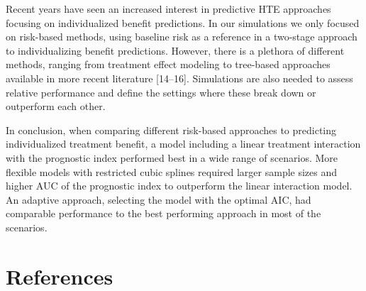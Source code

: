 \documentclass{article}
\begin{document}
Recent years have seen an increased interest in predictive HTE
approaches focusing on individualized benefit predictions. In our
simulations we only focused on risk-based methods, using baseline risk
as a reference in a two-stage approach to individualizing benefit
predictions. However, there is a plethora of different methods, ranging
from treatment effect modeling to tree-based approaches available in
more recent literature {[}14--16{]}. Simulations are also needed to
assess relative performance and define the settings where these break
down or outperform each other.

In conclusion, when comparing different risk-based approaches to
predicting individualized treatment benefit, a model including a linear
treatment interaction with the prognostic index performed best in a wide
range of scenarios. More flexible models with restricted cubic splines
required larger sample sizes and higher AUC of the prognostic index to
outperform the linear interaction model. An adaptive approach, selecting
the model with the optimal AIC, had comparable performance to the best
performing approach in most of the scenarios.

\newpage

\hypertarget{references}{%
\section{References}\label{references}}

\setlength{\parindent}{-0.25in}
\setlength{\leftskip}{0.25in}

\noindent
\end{document}
